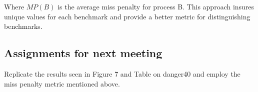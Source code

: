 \documentclass[10pt]{article}
\newcommand{\RNum}[1]{\uppercase\expandafter{\romannumeral #1\relax}}
\begin{document}
Where \( MP(B) \) is the average miss penalty for process B. This approach insures unique values
for each benchmark and provide a better metric for distinguishing benchmarks.

\subsection{Assignments for next meeting}
Replicate the results seen in Figure 7 and Table \RNum{5} on danger40 and employ the
miss penalty metric mentioned above.

%
%
%
%
%
\end{document}
